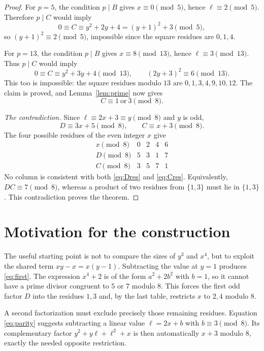 \documentclass[11pt,a4paper]{article}
\begin{document}
\begin{proof}
For $p=5$, the condition $p\mid B$ gives $x\equiv0\pmod5$, hence
$\ell\equiv2\pmod5$. Therefore $p\mid C$ would imply
\[
 0\equiv C\equiv y^2+2y+4=(y+1)^2+3\pmod5,
\]
so $(y+1)^2\equiv2\pmod5$, impossible since the square residues are
$0,1,4$.

For $p=13$, the condition $p\mid B$ gives $x\equiv8\pmod{13}$,
hence $\ell\equiv3\pmod{13}$. Thus $p\mid C$ would imply
\[
 0\equiv C\equiv y^2+3y+4\pmod{13},
 \qquad (2y+3)^2\equiv6\pmod{13}.
\]
This too is impossible: the square residues modulo $13$ are
$0,1,3,4,9,10,12$. The claim is proved, and Lemma~\ref{lem:prime} now gives
\begin{equation}\label{eq:Cres}
 C\equiv1\ \text{or}\ 3\pmod8.
\end{equation}

\textit{The contradiction.}
Since $\ell\equiv2x+3\equiv y\pmod8$ and $y$ is odd,
\[
 D\equiv3x+5\pmod8,\qquad C\equiv x+3\pmod8.
\]
The four possible residues of the even integer $x$ give
\[
\begin{array}{c|rrrr}
 x\pmod8&0&2&4&6\\ \hline
 D\pmod8&5&3&1&7\\
 C\pmod8&3&5&7&1
\end{array}
\]
No column is consistent with both \eqref{eq:Dres} and \eqref{eq:Cres}.
Equivalently, $DC\equiv7\pmod8$, whereas a product of two residues from
$\{1,3\}$ must lie in $\{1,3\}$. This contradiction proves the theorem.
\end{proof}

\section{Motivation for the construction}

The useful starting point is not to compare the sizes of $y^3$ and $x^4$,
but to exploit the shared term $xy-x=x(y-1)$. Subtracting the value at
$y=1$ produces \eqref{eq:first}. The expression $x^4+2$ is of the form
$a^2+2b^2$ with $b=1$, so it cannot have a prime divisor congruent to $5$
or $7$ modulo $8$. This forces the first odd factor $D$ into the
residues $1,3$ and, by the last table, restricts $x$ to $2,4$ modulo $8$.

A second factorization must exclude precisely those remaining residues.
Equation \eqref{eq:parity} suggests subtracting a linear value
$\ell=2x+b$ with $b\equiv3\pmod8$. Its complementary factor
$y^2+y\ell+\ell^2+x$ is then automatically $x+3$ modulo $8$, exactly the
needed opposite restriction.
\end{document}
